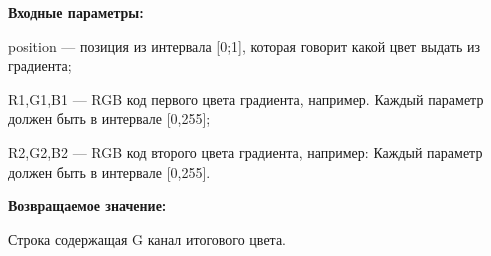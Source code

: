 \textbf{Входные параметры:}  

position --- позиция из интервала [0;1], которая говорит какой цвет выдать из градиента;
 
    R1,G1,B1 --- RGB код первого цвета градиента, например. Каждый параметр должен быть в интервале [0,255];
 
    R2,G2,B2 --- RGB код второго цвета градиента, например: Каждый параметр должен быть в интервале [0,255].

\textbf{Возвращаемое значение:}

Строка содержащая G канал итогового цвета.